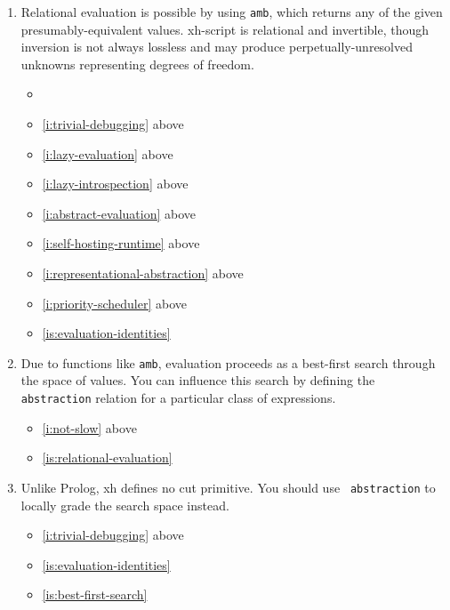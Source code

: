 \documentclass{report}
\makeatletter
\newcommand*{\Label}[2]{%
  \@bsphack
  \begingroup
    \label{#1-original}%
    \def\@currentlabel{#2 [\ref{#1-original}]}%
    \label{#1}%
  \endgroup
  \@esphack
}
\makeatother
\begin{document}
\begin{enumerate}
\item{}\Label{is:relational-evaluation}{relational}
  Relational evaluation is possible by using {\tt amb}, which returns any
  of the given presumably-equivalent values. xh-script is relational and
  invertible, though inversion is not always lossless and may produce
  perpetually-unresolved unknowns representing degrees of freedom.
\begin{itemize}
\item \initial
\item \ref{i:trivial-debugging} above
\item \ref{i:lazy-evaluation} above
\item \ref{i:lazy-introspection} above
\item \ref{i:abstract-evaluation} above
\item \ref{i:self-hosting-runtime} above
\item \ref{i:representational-abstraction} above
\item \ref{i:priority-scheduler} above
\item \ref{is:evaluation-identities}
\end{itemize}
\item{}\Label{is:best-first-search}{bestfirst}
  Due to functions like {\tt amb}, evaluation proceeds as a best-first
  search through the space of values. You can influence this search by
  defining the {\tt abstraction} relation for a particular class of
  expressions.
\begin{itemize}
\item \ref{i:not-slow} above
\item \ref{is:relational-evaluation}
\end{itemize}
\item{}\Label{is:no-cut-operator}{nocut}
  Unlike Prolog, xh defines no cut primitive. You should use {\tt
  abstraction} to locally grade the search space instead.
\begin{itemize}
\item \ref{i:trivial-debugging} above
\item \ref{is:evaluation-identities}
\item \ref{is:best-first-search}
\end{itemize}


\end{enumerate}
\end{document}

